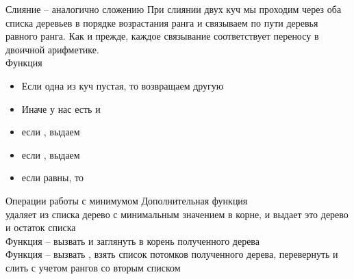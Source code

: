  
\begin{frame}{Слияние -- аналогично сложению}
 При слиянии двух куч мы проходим через оба списка деревьев в порядке
 возрастания ранга и связываем по пути деревья равного ранга. Как и
 прежде, каждое связывание соответствует переносу в двоичной
 арифметике.\\

Функция 
\begin{itemize}
\item Если одна из куч пустая, то возвращаем другую
\item Иначе у нас есть  и  
\item если , выдаем 
\item если , выдаем 
\item если равны, то 
\end{itemize}
 \end{frame}
 
\begin{frame}{Операции работы с минимумом}
Дополнительная функция \\
удаляет из списка дерево с минимальным значением в корне, и выдает это дерево и остаток списка\\

Функция  -- вызвать  и заглянуть в корень полученного дерева\\

Функция  -- вызвать , взять список потомков полученного дерева, перевернуть и слить с учетом рангов со вторым списком
\end{frame}
 
% 
% 
% 
 
